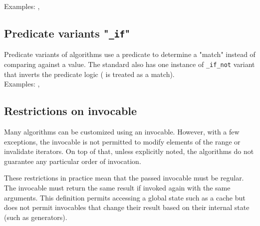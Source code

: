 \noindent Examples: , 

\subsection{Predicate variants "\texttt{\_if}"}

Predicate variants of algorithms use a predicate to determine a "match" instead of comparing against a value. The standard also has one instance of \texttt{\_if\_not} variant that inverts the predicate logic ( is treated as a match).\\

\noindent Examples: , 

\subsection{Restrictions on invocable}

Many algorithms can be customized using an invocable. However, with a few exceptions, the invocable is not permitted to modify elements of the range or invalidate iterators. On top of that, unless explicitly noted, the algorithms do not guarantee any particular order of invocation.

These restrictions in practice mean that the passed invocable must be regular. The invocable must return the same result if invoked again with the same arguments. This definition permits accessing a global state such as a cache but does not permit invocables that change their result based on their internal state (such as generators).